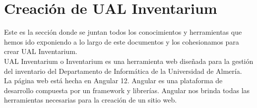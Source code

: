 \section{Creación de UAL Inventarium}\label{sec:4_web}
Este es la sección donde se juntan todos los conocimientos y herramientas que hemos ido exponiendo a lo largo de este documentos y los cohesionamos para crear UAL Inventarium.
\\UAL Inventarium o Inventarium es una herramienta web diseñada para la gestión del inventario del Departamento de Informática de la Universidad de Almería.
\\La página web está hecha en Angular 12. Angular es una plataforma de desarrollo compuesta por un framework y librerías. Angular nos brinda todas las herramientas necesarias para la creación de un sitio web.

